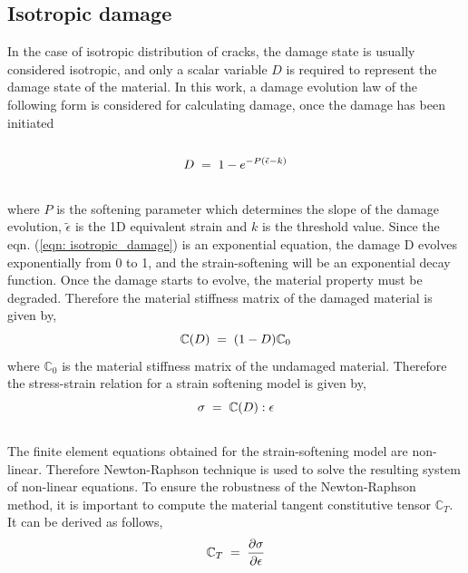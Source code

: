 \documentclass[12pt,twoside]{report}
\begin{document}
\subsection{Isotropic damage}
\indent\indent\indent In the case of isotropic distribution of cracks, the damage state is usually considered isotropic, and only a scalar variable $D$ is required to represent the damage state of the material. In this work, a damage evolution law of the following form is considered for calculating damage, once the damage has been initiated
\\
\\
\begin{equation}
  \large{ D \; = \; 1 - e^{-P(\tilde{\epsilon} - k)}}
  \label{eqn: isotropic_damage}
\end{equation} 
\\
where $P$ is the softening parameter which determines the slope of the damage evolution, $\tilde{\epsilon}$ is the 1D equivalent strain and $k$ is the threshold value. Since the eqn. (\ref{eqn: isotropic_damage}) is an exponential equation, the damage D evolves exponentially from 0 to 1, and the strain-softening will be an exponential decay function. Once the damage starts to evolve, the material property must be degraded. Therefore the material stiffness matrix of the  damaged material is given by,\\
\begin{equation}
\large{\mathbb{C}(D) \; = \; (1  - D) \mathbb{C}_{0} }
\end{equation} 
where $\mathbb{C}_{0}$ is the material stiffness matrix of the undamaged material. Therefore the stress-strain relation for a strain softening model is given by,\\
\begin{equation}
\large{\sigma \; = \; \mathbb{C}(D) : \epsilon }  
\end{equation}
\\
The finite element equations obtained for the strain-softening model are non-linear. Therefore Newton-Raphson technique is used to solve the resulting system of non-linear equations. To ensure the robustness of the Newton-Raphson method, it is important to compute the material tangent constitutive tensor $\mathbb{C}_{T}$. It can be derived as follows,\\
\begin{equation*}
\large{ \mathbb{C}_{T}  \; = \;\frac{\partial \sigma}{\partial \epsilon}  }
\end{equation*}
\end{document}
